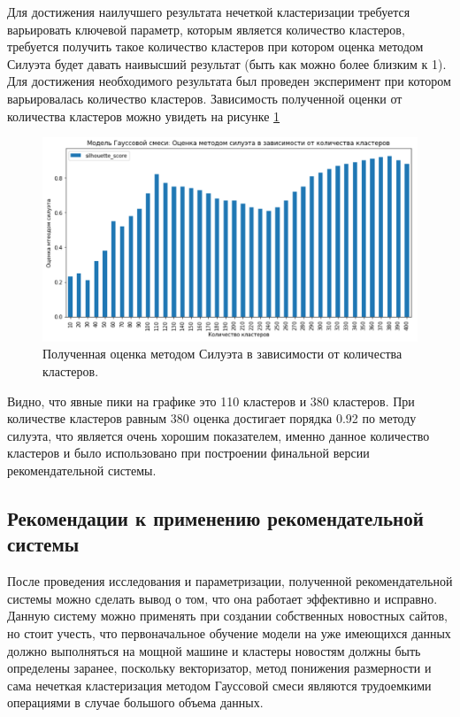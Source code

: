 Для достижения наилучшего результата нечеткой кластеризации требуется варьировать ключевой параметр, которым является количество кластеров, требуется получить такое количество кластеров при котором оценка методом Силуэта будет давать наивысший результат (быть как можно более близким к 1). Для достижения необходимого результата был проведен эксперимент при котором варьировалась количество кластеров. Зависимость полученной оценки от количества кластеров можно увидеть на рисунке \ref{SilhScore}

\begin{figure}[H]
	\centering
	\includegraphics[width=\textwidth]{img/SilhScore.pdf}
	\caption{Полученная оценка методом Силуэта в зависимости от количества кластеров.}
	\label{SilhScore}
\end{figure}  

Видно, что явные пики на графике это 110 кластеров и 380 кластеров. При количестве кластеров равным 380 оценка достигает порядка 0.92 по методу силуэта, что является очень хорошим показателем, именно данное количество кластеров и было использовано при построении финальной версии рекомендательной системы.

\subsection{Рекомендации к применению рекомендательной системы}

После проведения исследования и параметризации, полученной рекомендательной системы можно сделать вывод о том, что она работает эффективно и исправно. Данную систему можно применять при создании собственных новостных сайтов, но стоит учесть, что первоначальное обучение модели на уже имеющихся данных должно выполняться на мощной машине и кластеры новостям должны быть определены заранее, поскольку векторизатор, метод понижения размерности и сама нечеткая кластеризация методом Гауссовой смеси являются трудоемкими операциями в случае большого объема данных.

